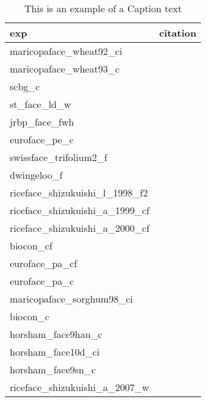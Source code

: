 \begin{table}[ht]
\centering
\begin{tabular}{ll}
  \hline
exp & citation \\ 
  \hline
maricopaface\_wheat92\_ci & \cite{adamsen_et_al_2005}   \\
  maricopaface\_wheat93\_c & \cite{asseng_et_al_2004}   \\
  scbg\_c & \cite{chen_et_al_2012}   \\
  st\_face\_ld\_w & \cite{dawes_et_al_2015}   \\
  jrbp\_face\_fwh & \cite{dukes_et_al_2005}   \\
  euroface\_pe\_c & \cite{gielen_et_al_2005}   \\
  swissface\_trifolium2\_f & \cite{hebeisen_et_al_1997}   \\
  dwingeloo\_f & \cite{hoosbeek_et_al_2002}   \\
  riceface\_shizukuishi\_l\_1998\_f2 & \cite{kim_et_al_2003}   \\
  riceface\_shizukuishi\_a\_1999\_cf & \cite{kim_et_al_2003}   \\
  riceface\_shizukuishi\_a\_2000\_cf & \cite{kim_et_al_2003}   \\
  biocon\_cf & \cite{lee_et_al_2011}   \\
  euroface\_pa\_cf & \cite{liberloo_et_al_2004}   \\
  euroface\_pa\_c & \cite{liberloo_et_al_2006}   \\
  maricopaface\_sorghum98\_ci & \cite{ottman_et_al_2001}   \\
  biocon\_c & \cite{reich_et_al_2001}   \\
  horsham\_face9han\_c & \cite{tausz-posch_et_al_2012}   \\
  horsham\_face10d\_ci & \cite{tausz-posch_et_al_2012}   \\
  horsham\_face9sn\_c & \cite{tausz-posch_et_al_2015}   \\
  riceface\_shizukuishi\_a\_2007\_w & \cite{tokida_et_al_2010}   \\
  \end{tabular}
\caption{This is an example of a Caption text} 
\end{table}
